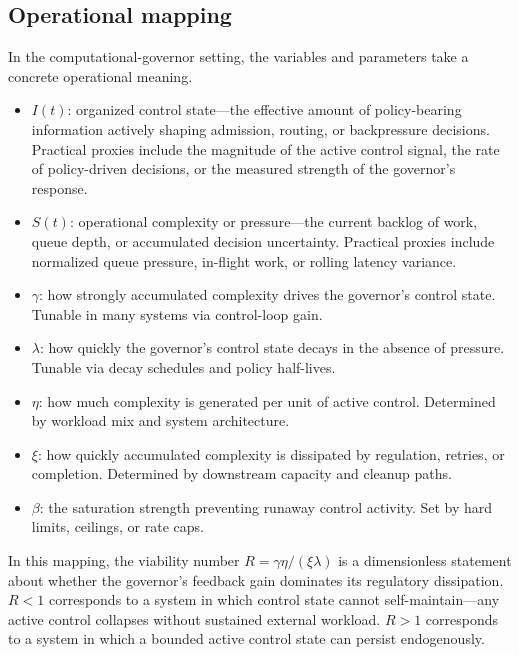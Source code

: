 \documentclass[11pt]{article}
\begin{document}
\subsection{Operational mapping}
In the computational-governor setting, the variables and parameters take a concrete operational meaning.
\begin{itemize}
  \item $I(t)$: organized control state---the effective amount of policy-bearing information actively shaping admission, routing, or backpressure decisions. Practical proxies include the magnitude of the active control signal, the rate of policy-driven decisions, or the measured strength of the governor's response.
  \item $S(t)$: operational complexity or pressure---the current backlog of work, queue depth, or accumulated decision uncertainty. Practical proxies include normalized queue pressure, in-flight work, or rolling latency variance.
  \item $\gamma$: how strongly accumulated complexity drives the governor's control state. Tunable in many systems via control-loop gain.
  \item $\lambda$: how quickly the governor's control state decays in the absence of pressure. Tunable via decay schedules and policy half-lives.
  \item $\eta$: how much complexity is generated per unit of active control. Determined by workload mix and system architecture.
  \item $\xi$: how quickly accumulated complexity is dissipated by regulation, retries, or completion. Determined by downstream capacity and cleanup paths.
  \item $\beta$: the saturation strength preventing runaway control activity. Set by hard limits, ceilings, or rate caps.
\end{itemize}
In this mapping, the viability number $R=\gamma\eta/(\xi\lambda)$ is a dimensionless statement about whether the governor's feedback gain dominates its regulatory dissipation. $R<1$ corresponds to a system in which control state cannot self-maintain---any active control collapses without sustained external workload. $R>1$ corresponds to a system in which a bounded active control state can persist endogenously.
\end{document}
